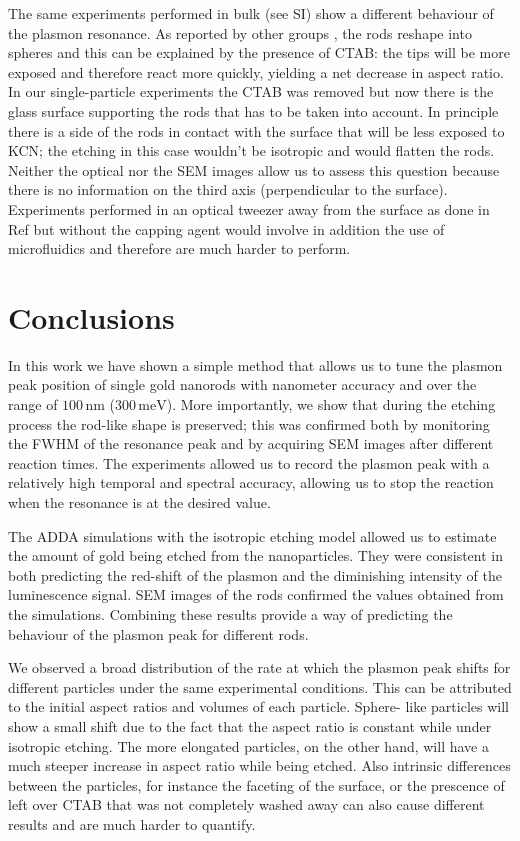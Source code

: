 \documentclass[a4paper,oneside,onecolumn]{article}
\newcommand{\nm}{\ensuremath{\,\textrm{nm}}}
\newcommand{\meV}{\ensuremath{\,\textrm{meV}}}
\begin{document}
The same experiments performed in bulk (see SI) show a different behaviour of
the plasmon resonance. As reported by other groups \cite{Jana2002}
\cite{Yuan2015}, the rods reshape into spheres and this can be explained by the
presence of CTAB: the tips will be more exposed and therefore react more
quickly, yielding a net decrease in aspect ratio. In our single-particle
experiments the CTAB was removed but now there is the glass surface supporting the rods that has
to be taken into account. In principle there is a side of the rods in contact
with the surface that will be less exposed to KCN; the etching in this case
wouldn't be isotropic and would flatten the rods. Neither the optical nor the
SEM images allow us to assess this question because there is no information on the
third axis (perpendicular to the surface). Experiments performed in an optical
tweezer away from the surface as done in Ref \cite{Ni2012} but without the
capping agent would involve in addition the use of microfluidics and therefore
are much harder to perform.

\section{Conclusions}

In this work we have shown a simple method that allows us to tune the plasmon
peak position of single gold nanorods with nanometer accuracy and over the
range of $100\nm$ ($300\meV$). More importantly, we show that during the
etching process the rod-like shape is preserved; this was confirmed both by
monitoring the FWHM of the resonance peak and by acquiring SEM images after
different reaction times. The experiments allowed us to record the plasmon
peak with a relatively high temporal and spectral accuracy, allowing us to
stop the reaction when the resonance is at the desired value.

The ADDA simulations with the isotropic etching model allowed us to estimate
the amount of gold being etched from the nanoparticles. They were consistent
in both predicting the red-shift of the plasmon and the diminishing intensity
of the luminescence signal. SEM images of the rods confirmed the values
obtained from the simulations. Combining these results provide a way of
predicting the behaviour of the plasmon peak for different rods.

We observed a broad distribution of the rate at which the plasmon peak shifts
for different particles under the same experimental conditions. This can be
attributed to the initial aspect ratios and volumes of each particle. Sphere-
like particles will show a small shift due to the fact that the aspect ratio
is constant while under isotropic etching. The more elongated particles, on
the other hand, will have a much steeper increase in aspect ratio while being
etched. Also intrinsic differences between the particles, for instance the
faceting of the surface, or the prescence of left over CTAB that was not
completely washed away can also cause different results and are much harder to
quantify.
\end{document}
